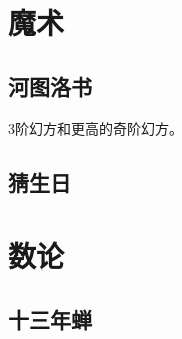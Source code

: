 \documentclass[12pt, letterpaper]{ctexrep}
\begin{document}
\chapter{魔术}


\section{河图洛书}
3阶幻方和更高的奇阶幻方。


\section{猜生日}




\chapter{数论}


\section{十三年蝉}
\end{document}
